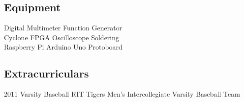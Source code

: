 \documentclass[]{deedy-resume-openfont}
\begin{document}
\begin{minipage}[t]{0.33\textwidth}
\subsection{Equipment}
Digital Multimeter \textbullet{} Function Generator \\ 
Cyclone FPGA \textbullet{} Oscilloscope \textbullet{} Soldering \\ Raspberry Pi \textbullet{} Arduino Uno \textbullet{}
Protoboard
\sectionsep

\subsection{Extracurriculars}
2011 Varsity Baseball \textbullet{} RIT Tigers Men's Intercollegiate Varsity Baseball Team 
\sectionsep
%
%

\end{minipage} 
\hfill
\end{document}
